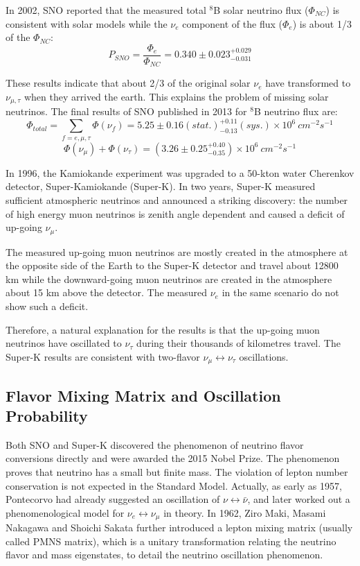 \documentclass[preprint,12pt]{elsarticle}
\numberwithin{equation}{section}
\begin{document}
In 2002, SNO reported that the measured total $^8$B solar neutrino flux ($\Phi_{NC}$) is consistent with solar models while the $\nu_e$ component of the flux ($\Phi_e$) is about 1/3 of the $\Phi_{NC}$\cite{SNO}:
\[
P_{SNO} = \frac{\Phi_e}{\Phi_{NC}}= 0.340\pm0.023^{+0.029}_{-0.031}
\]

These results indicate that about 2/3 of the original solar $\nu_e$ have transformed to $\nu_{\mu,\tau}$ when they arrived the earth. This explains the problem of missing solar neutrinos. The final results of SNO published in 2013\cite{SNOresult} for $^8$B neutrino flux are:
\[
\Phi_{total} = \sum_{f=e,\mu,\tau}\Phi(\nu_f)= 5.25\pm0.16(stat.)_{-0.13}^{+0.11}(sys.)\times10^6~cm^{-2}s^{-1}
\]
\[\Phi(\nu_\mu)+\Phi(\nu_\tau)=(3.26\pm0.25^{+0.40}_{-0.35})\times 10^6~cm^{-2}s^{-1}
\]

In 1996, the Kamiokande experiment was upgraded to a 50-kton water Cherenkov detector, Super-Kamiokande (Super-K). In two years, Super-K measured sufficient atmospheric neutrinos and announced a striking discovery: the number of high energy muon neutrinos is zenith angle dependent and caused a deficit of up-going $\nu_\mu$. 

The measured up-going muon neutrinos are mostly created in the atmosphere at the opposite side of the Earth to the Super-K detector and travel about 12800 km while the downward-going muon neutrinos are created in the atmosphere about 15 km above the detector. The measured $\nu_e$ in the same scenario do not show such a deficit.

Therefore, a natural explanation for the results is that the up-going muon neutrinos have oscillated to $\nu_\tau$ during their thousands of kilometres travel. The Super-K results are consistent with two-flavor $\nu_\mu\leftrightarrow\nu_\tau$ oscillations\cite{superK}.


\subsection{Flavor Mixing Matrix and Oscillation Probability}
Both SNO and Super-K discovered the phenomenon of neutrino flavor conversions directly and were awarded the 2015 Nobel Prize. The phenomenon proves that neutrino has a small but finite mass. The violation of lepton number conservation is not expected in the Standard Model. Actually, as early as 1957, Pontecorvo had already suggested an oscillation of $\nu\leftrightarrow\bar{\nu}$, and later worked out a phenomenological model for $\nu_e\leftrightarrow\nu_\mu$ in theory\cite{nobeldoc}. In 1962, Ziro Maki, Masami Nakagawa and Shoichi Sakata further introduced a lepton mixing matrix (usually called PMNS matrix), which is a unitary transformation relating the neutrino flavor and mass eigenstates, to detail the neutrino oscillation phenomenon.
\end{document}
